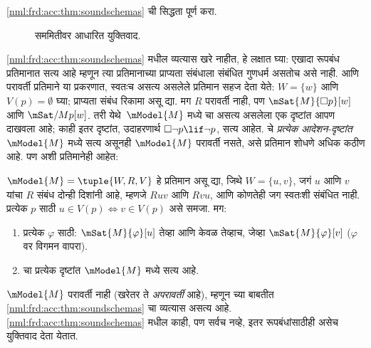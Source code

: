 \begin{prob}
  \ref{nml:frd:acc:thm:soundschemas} ची सिद्धता पूर्ण करा.
\end{prob}

\begin{figure}
  \begin{center}
  \end{center}
\caption{सममितीवर आधारित युक्तिवाद.}
\label{nml:frd:acc:fig:Bsymm}
\end{figure}

\ref{nml:frd:acc:thm:soundschemas} मधील व्यत्यास खरे नाहीत, हे लक्षात
घ्या: एखादा रूपबंध प्रतिमानात सत्य आहे म्हणून त्या प्रतिमानाच्या
प्राप्यता संबंधाला संबंधित गुणधर्म असतोच असे नाही.
 आणि परावर्ती प्रतिमाने या प्रकरणात,  स्वतःच
असत्य असलेले प्रतिमान सहज देता येते: $W = \{w\}$ आणि
$V(p) = \emptyset$ घ्या; प्राप्यता संबंध रिकामा असू द्या.
मग $R$ परावर्ती नाही, पण $\mSat{M}{\Box
  p}[w]$ आणि $\mSat/{M}{p}[w]$. तरी येथे~$\mModel{M}$
मध्ये  चा असत्य असलेला एक दृष्टांत आपण दाखवला आहे; काही इतर दृष्टांत,
उदाहरणार्थ $\Box \lnot p \lif \lnot p$, सत्य आहेत.
 चे \emph{प्रत्येक आदेशन-दृष्टांत}~$\mModel{M}$
मध्ये सत्य असूनही $\mModel{M}$ परावर्ती नसते, असे
प्रतिमान शोधणे अधिक कठीण आहे. पण अशी प्रतिमानेही आहेत:

\begin{prop}\label{nml:frd:acc:prop:reflexive}
  $\mModel{M} = \tuple{W, R, V}$ हे प्रतिमान असू द्या,
  जिथे $W = \{u, v
  \}$, जगं $u$ आणि $v$ यांचा $R$ संबंध दोन्ही दिशांनी
  आहे, म्हणजे $Ruv$ आणि $Rvu$, आणि कोणतेही जग स्वतःशी
  संबंधित नाही. प्रत्येक $p$ साठी $u \in V(p) \Leftrightarrow v
  \in V(p)$ असे समजा. मग:
  \begin{enumerate}
  \item प्रत्येक $\varphi$ साठी: $\mSat{M}{\varphi}[u]$ तेव्हा आणि
    केवळ तेव्हाच, जेव्हा $\mSat{M}{\varphi}[v]$
    ($\varphi$ वर विगमन वापरा).
  \item {} चा प्रत्येक दृष्टांत $\mModel{M}$ मध्ये सत्य आहे.
  \end{enumerate}
  $\mModel{M}$ परावर्ती नाही (खरेतर ते
  \emph{अपरावर्ती} आहे), म्हणून  च्या बाबतीत
  \ref{nml:frd:acc:thm:soundschemas} चा व्यत्यास असत्य आहे.
  \ref{nml:frd:acc:thm:soundschemas} मधील काही, पण सर्वच नव्हे,
  इतर रूपबंधांसाठीही असेच युक्तिवाद देता येतात.
\end{prop}

